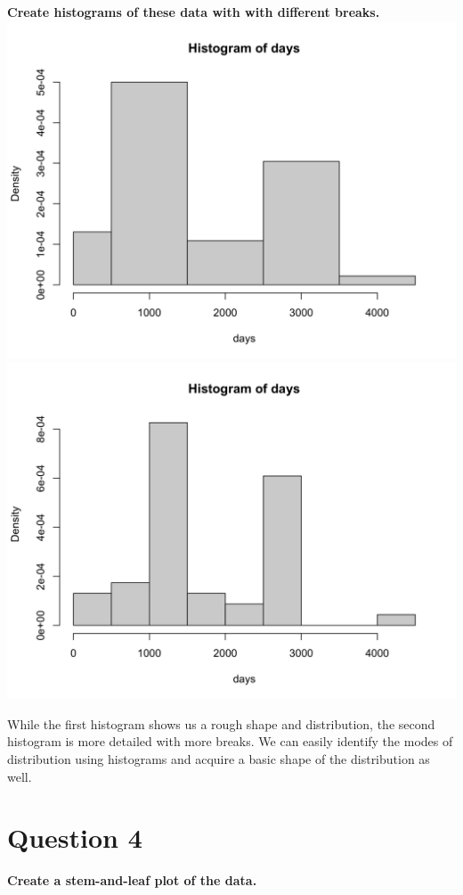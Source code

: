 \documentclass[
]{book}
\begin{document}
\textbf{Create histograms of these data with with different breaks.}
\includegraphics{unnamed-chunk-3-1.png}
\includegraphics{unnamed-chunk-3-2.png}

While the first histogram shows us a rough shape and distribution, the second histogram is more detailed with more breaks. We can easily identify the modes of distribution using histograms and acquire a basic shape of the distribution as well.

\section{Question 4}\label{question-4}

\textbf{Create a stem-and-leaf plot of the data.}
\end{document}
